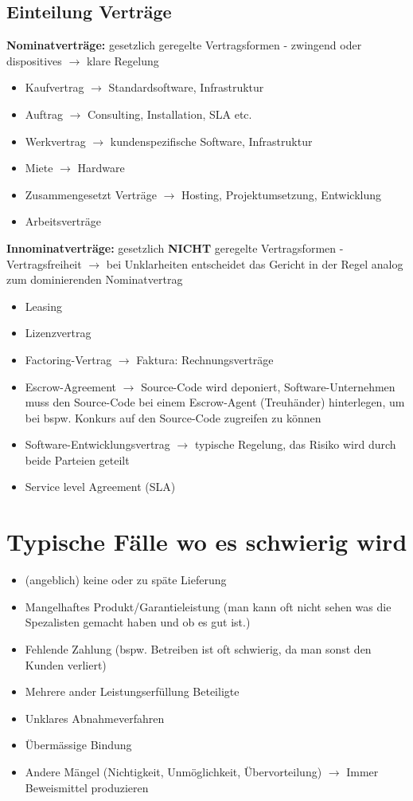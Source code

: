 \documentclass{report}
\theoremstyle{definition}
\theoremstyle{example}
\begin{document}
\subsection{Einteilung Verträge}
\textbf{Nominatverträge:} gesetzlich geregelte Vertragsformen - zwingend oder dispositives $\rightarrow$ klare Regelung\\
\begin{itemize}
   \item Kaufvertrag $\rightarrow$ Standardsoftware, Infrastruktur
   \item Auftrag $\rightarrow$ Consulting, Installation, SLA etc.
   \item Werkvertrag $\rightarrow$ kundenspezifische Software, Infrastruktur
   \item Miete $\rightarrow$ Hardware
   \item Zusammengesetzt Verträge $\rightarrow$ Hosting, Projektumsetzung, Entwicklung
   \item Arbeitsverträge
\end{itemize}

\textbf{Innominatverträge:} gesetzlich \textbf{NICHT} geregelte Vertragsformen - Vertragsfreiheit $\rightarrow$ bei Unklarheiten entscheidet das Gericht in der Regel analog zum dominierenden Nominatvertrag
\begin{itemize}
   \item Leasing
   \item Lizenzvertrag
   \item Factoring-Vertrag $\rightarrow$ Faktura: Rechnungsverträge
   \item Escrow-Agreement $\rightarrow$ Source-Code wird deponiert, Software-Unternehmen muss den Source-Code bei einem Escrow-Agent (Treuhänder) hinterlegen, um bei bspw. Konkurs auf den Source-Code zugreifen zu können
   \item Software-Entwicklungsvertrag $\rightarrow$ typische Regelung, das Risiko wird durch beide Parteien geteilt
   \item Service level Agreement (SLA)
\end{itemize}

\section{Typische Fälle wo es schwierig wird}
\begin{itemize}
   \item (angeblich) keine oder zu späte Lieferung
   \item Mangelhaftes Produkt/Garantieleistung (man kann oft nicht sehen was die Spezalisten gemacht haben und ob es gut ist.)
   \item Fehlende Zahlung (bspw. Betreiben ist oft schwierig, da man sonst den Kunden verliert)
   \item Mehrere ander Leistungserfüllung Beteiligte
   \item Unklares Abnahmeverfahren
   \item Übermässige Bindung
   \item Andere Mängel (Nichtigkeit, Unmöglichkeit, Übervorteilung) $\rightarrow$ Immer Beweismittel produzieren
\end{itemize}
\end{document}
